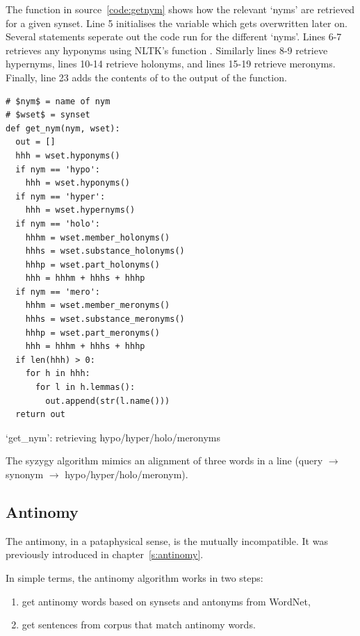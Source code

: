 The  function in source~\ref{code:getnym} shows how the relevant `nyms' are retrieved for a given synset. Line 5 initialises the variable  which gets overwritten later on. Several  statements seperate out the code run for the different `nyms'. Lines 6-7 retrieves any hyponyms using \ac{NLTK}'s  function . Similarly lines 8-9 retrieve hypernyms, lines 10-14 retrieve holonyms, and lines 15-19 retrieve meronyms. Finally, line 23 adds the contents of  to the output of the function.

\begin{listing}
  \begin{verbatim}
# $nym$ = name of nym
# $wset$ = synset
def get_nym(nym, wset):
  out = []
  hhh = wset.hyponyms()
  if nym == 'hypo':
    hhh = wset.hyponyms()
  if nym == 'hyper':
    hhh = wset.hypernyms()
  if nym == 'holo':
    hhhm = wset.member_holonyms()
    hhhs = wset.substance_holonyms()
    hhhp = wset.part_holonyms()
    hhh = hhhm + hhhs + hhhp
  if nym == 'mero':
    hhhm = wset.member_meronyms()
    hhhs = wset.substance_meronyms()
    hhhp = wset.part_meronyms()
    hhh = hhhm + hhhs + hhhp
  if len(hhh) > 0:
    for h in hhh:
      for l in h.lemmas():
        out.append(str(l.name()))
  return out
  \end{verbatim}
\caption[`get\_nym' function]{`get\_nym': retrieving hypo/hyper/holo/meronyms}
\label{code:getnym}
\end{listing}

The syzygy algorithm mimics an alignment of three words in a line (query $\to$ synonym $\to$ hypo/hyper/holo/meronym).


\subsection{Antinomy}
\label{s:antinomyalgo}

The antimony, in a pataphysical sense, is the mutually incompatible. It was previously introduced in chapter~\ref{s:antinomy}.

In simple terms, the antinomy algorithm works in two steps:
\begin{enumerate}
  \item get antinomy words based on synsets and antonyms from WordNet,
  \item get sentences from corpus that match antinomy words.
\end{enumerate}


